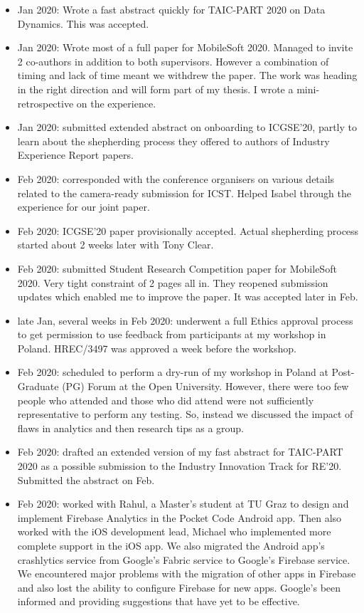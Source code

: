 \begin{itemize}
    \item {} Jan 2020: Wrote a fast abstract quickly for TAIC-PART 2020 on Data Dynamics. This was accepted.
    \item Jan 2020: Wrote most of a full paper for MobileSoft 2020. Managed to invite 2 co-authors in addition to both supervisors. However a combination of timing and lack of time meant we withdrew the paper. The work was heading in the right direction and will form part of my thesis. I wrote a mini-retrospective on the experience. 
    \item {} Jan 2020: submitted extended abstract on onboarding to ICGSE'20, partly to learn about the shepherding process they offered to authors of Industry Experience Report papers.
    \item Feb 2020: corresponded with the conference organisers on various details related to the camera-ready submission for ICST. Helped Isabel through the experience for our joint paper.
    \item {} Feb 2020: ICGSE'20 paper provisionally accepted. Actual shepherding process started about 2 weeks later with Tony Clear.
    \item {} Feb 2020: submitted Student Research Competition paper for MobileSoft 2020. Very tight constraint of 2 pages all in. They reopened submission updates which enabled me to improve the paper. It was accepted later in Feb. 
    \item late Jan, several weeks in Feb 2020: underwent a full Ethics approval process to get permission to use feedback from participants at my workshop in Poland. HREC/3497 was approved a week before the workshop.
    \item {} Feb 2020: scheduled to perform a dry-run of my workshop in Poland at Post-Graduate (PG) Forum at the Open University. However, there were too few people who attended and those who did attend were not sufficiently representative to perform any testing. So, instead we discussed the impact of flaws in analytics and then research tips as a group.
    \item Feb 2020: drafted an extended version of my fast abstract for TAIC-PART 2020 as a possible submission to the Industry Innovation Track for RE'20. Submitted the abstract on  Feb.
    \item Feb 2020: worked with Rahul, a Master's student at TU Graz to design and implement Firebase Analytics in the Pocket Code Android app. Then also worked with the iOS development lead, Michael who implemented more complete support in the iOS app. We also migrated the Android app's crashlytics service from Google's Fabric service to Google's Firebase service. We encountered major problems with the migration of other apps in Firebase and also lost the ability to configure Firebase for new apps. Google's been informed and providing suggestions that have yet to be effective.

\end{itemize}
